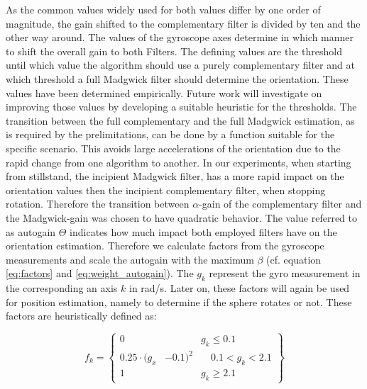 \documentclass[letterpaper, 10 pt, conference]{ieeeconf}  %
\begin{document}
 As the common values widely used for both values differ by one order of magnitude, the gain shifted to the complementary filter is divided by ten and the other way around.
 The values of the gyroscope axes determine in which manner to shift the overall gain to both Filters. 
 The defining values are the threshold until which value the algorithm should use a purely complementary filter and at which threshold a full Madgwick filter should determine the orientation. 
 These values have been determined empirically.
 Future work will investigate on improving those values by developing a suitable heuristic for the thresholds.
 The transition between the full complementary and the full Madgwick estimation, as is required by the prelimitations,  can be done by a function suitable for the specific scenario.
 This avoids large accelerations of the orientation due to the rapid change from one algorithm to another.
 In our experiments, when starting from stillstand, the incipient Madgwick filter, has a more rapid impact on the orientation values then the incipient complementary filter, when stopping rotation. 
Therefore the transition between $\alpha$-gain of the complementary filter and the Madgwick-gain was chosen to have quadratic behavior. 
The value referred to as autogain $\Theta$ indicates how much impact both employed filters have on the orientation estimation. 
Therefore we calculate factors from the gyroscope measurements and scale the autogain with the maximum $\beta$ (cf. equation \ref{eq:factors} and \ref{eq:weight_autogain}).
The $g_{k}$ represent the gyro measurement in the corresponding an axis $k$ in rad/s. Later on, these factors will again be used for position estimation, namely to determine if the sphere rotates or not.
These factors are heuristically defined as:

\begin{equation}
f_k =
\left\{
\begin{align}
0& & g_k \leq 0.1  \\ 
0.25\cdot (g_x&-0.1)^2& \quad 0.1< g_k <2.1 \\
 1& & g_k \geq 2.1
\end{align}
\label{eq:factors}
\right\}
\end{equation}
\end{document}
